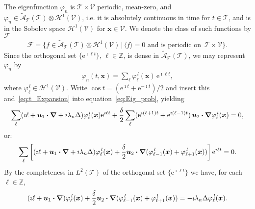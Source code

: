 \documentclass[leqno,onefignum,onetabnum]{siamltex1213}
\newcommand{\e}{\mathrm{e}}
\newcommand{\Tc}{\mathcal{T}}
\newcommand{\Vc}{\mathcal{V}}
\newcommand{\Hs}{\mathscr{H}}
\newcommand{\As}{\mathscr{A}}
\newcommand{\Fs}{\mathscr{F}}
\newcommand\bnabla{\mbox{\boldmath${\nabla}$}}
\providecommand\bcdot{\boldsymbol{\cdot}}
\newcommand{\vecx}{\boldsymbol{x}}
\newcommand{\vecu}{\boldsymbol{u}}
\begin{document}
The eigenfunction $\varphi_n$ is $\Tc\times\Vc$ periodic, mean-zero, and
$\varphi_n\in\tilde{\As}_{\Tc}(\Tc)\otimes\Hs^1(\Vc)$,
i.e. it is absolutely continuous in time
for $t\in\Tc$, and is in the Sobolev space $\Hs^1(\Vc)$ for
$\vecx\in\Vc$. We denote the class of such functions by $\Fs$
%
\begin{align}\label{eq:F}
  \Fs=\{f\in\tilde{\As}_{\Tc}(\Tc)\otimes\Hs^1(\Vc)\,|\, \langle f\rangle=0  \text{ and is periodic on }
  \, \Tc\times\Vc\}. 
\end{align}
%
Since the orthogonal set $\{\e^{\imath\ell t}\}$,
${\ell\in\mathbb{Z}}$, is dense in $\tilde{\As}_{\Tc}(\Tc)$, we may represent $\varphi_n$ by 
%
\begin{align}\label{eq:t_Expansion}
  \varphi_n(t,\vecx)=\sum_\ell\varphi_\ell^{\,l}(\vecx)\,\e^{\imath \ell t},
\end{align}
%
where $\varphi_\ell^{\,l}\in\Hs^1(\Vc)$. Write $\cos{t}=(\e^{\imath t}+\e^{-\imath t})/2$ and insert
this and~\eqref{eq:t_Expansion} into equation~\eqref{eq:Eig_prob},
yielding   
%
\begin{align}
  \sum_\ell(\imath \ell + \vecu _1\bcdot\bnabla +\imath\lambda_n\Delta)\varphi_\ell^{\,l}(\vecx)\e^{\imath \ell t}
 +\frac{\delta}{2}\sum_\ell(\e^{\imath(\ell+1)t}+\e^{\imath(\ell-1)t})\,\vecu _2\bcdot\bnabla \varphi_\ell^{\,l}(\vecx)=0,
\end{align}
%
or:
%
\begin{align}
  \sum_\ell\left[(\imath \ell + \vecu _1\bcdot\bnabla +\imath\lambda_n\Delta)\varphi_\ell^{\,l}(\vecx)
 +\frac{\delta}{2}\vecu _2\bcdot\bnabla (\varphi^{\,l}_{\ell-1}(\vecx)+\varphi^{\,l}_{\ell+1}(\vecx))\right]\e^{\imath \ell t}=0.
\end{align}
%
By the completeness in $L^2(\Tc)$ of the orthogonal set $\{\e^{\imath \ell t}\}$ we
have, for each $\ell\in\mathbb{Z}$, 
%
\begin{align}\label{eq:Eig_prob_shift}
  (\imath \ell + \vecu _1\bcdot\bnabla )\varphi_\ell^{\,l}(\vecx)
 +\frac{\delta}{2}\vecu _2\bcdot\bnabla (\varphi_{\ell-1}^{\,l}(\vecx)+\varphi_{\ell+1}^{\,l}(\vecx))
 =-\imath\lambda_n\Delta\varphi_\ell^{\,l}(\vecx).
\end{align}
%
\end{document}
